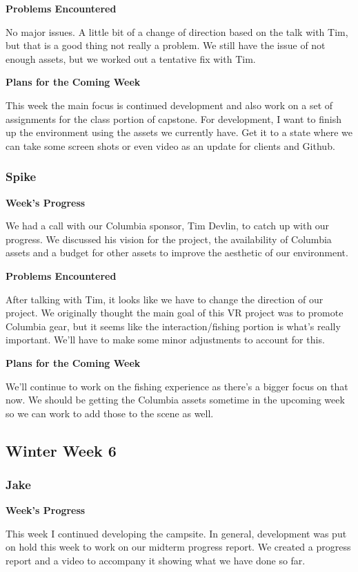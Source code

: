 \documentclass[10pt,journal,compsoc,onecolumn, draftclsnofoot]{IEEEtran}
\begin{document}
\noindent \textbf{Problems Encountered}

No major issues. A little bit of a change of direction based on the talk with Tim, but that is a good thing not really a problem. We still have the issue of not enough assets, but we worked out a tentative fix with Tim.

\noindent \textbf{Plans for the Coming Week}

This week the main focus is continued development and also work on a set of assignments for the class portion of capstone. For development, I want to finish up the environment using the assets we currently have.  Get it to a state where we can take some screen shots or even video as an update for clients and Github.

\subsubsection{Spike}
\noindent \textbf{Week's Progress}

We had a call with our Columbia sponsor, Tim Devlin, to catch up with our progress. We discussed his vision for the project, the availability of Columbia assets and a budget for other assets to improve the aesthetic of our environment.

\noindent \textbf{Problems Encountered}

After talking with Tim, it looks like we have to change the direction of our project. We originally thought the main goal of this VR project was to promote Columbia gear, but it seems like the interaction/fishing portion is what's really important. We'll have to make some minor adjustments to account for this.

\noindent \textbf{Plans for the Coming Week}

We'll continue to work on the fishing experience as there's a bigger focus on that now. We should be getting the Columbia assets sometime in the upcoming week so we can work to add those to the scene as well.

\subsection{Winter Week 6}
\subsubsection{Jake}
\noindent \textbf{Week's Progress}

This week I continued developing the campsite. In general, development was put on hold this week to work on our midterm progress report. We created a progress report and a video to accompany it showing what we have done so far.
\end{document}
